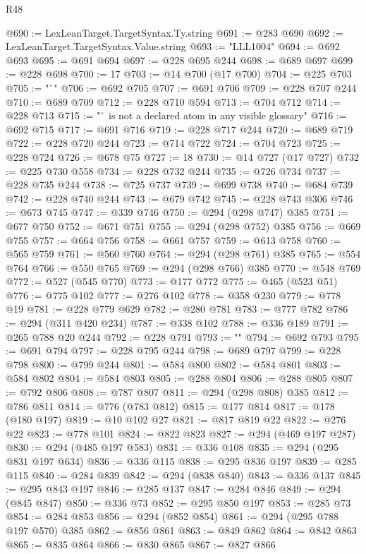 \begin{lexlean}{R48}
\begin{coremodule}
@690 := LexLeanTarget.TargetSyntax.Ty.string
@691 := @283 @690
@692 := LexLeanTarget.TargetSyntax.Value.string
@693 := "LLL1004"
@694 := @692 @693
@695 := @691 @694
@697 := @228 @695 @244
@698 := @689 @697
@699 := @228 @698
@700 := 17
@703 := @14 @700 (@17 @700)
@704 := @225 @703
@705 := "`"
@706 := @692 @705
@707 := @691 @706
@709 := @228 @707 @244
@710 := @689 @709
@712 := @228 @710 @594
@713 := @704 @712
@714 := @228 @713
@715 := "` is not a declared atom in any visible glossary"
@716 := @692 @715
@717 := @691 @716
@719 := @228 @717 @244
@720 := @689 @719
@722 := @228 @720 @244
@723 := @714 @722
@724 := @704 @723
@725 := @228 @724
@726 := @678 @75
@727 := 18
@730 := @14 @727 (@17 @727)
@732 := @225 @730 @558
@734 := @228 @732 @244
@735 := @726 @734
@737 := @228 @735 @244
@738 := @725 @737
@739 := @699 @738
@740 := @684 @739
@742 := @228 @740 @244
@743 := @679 @742
@745 := @228 @743 @306
@746 := @673 @745
@747 := @339 @746
@750 := @294 (@298 @747) @385
@751 := @677 @750
@752 := @671 @751
@755 := @294 (@298 @752) @385
@756 := @669 @755
@757 := @664 @756
@758 := @661 @757
@759 := @613 @758
@760 := @565 @759
@761 := @560 @760
@764 := @294 (@298 @761) @385
@765 := @554 @764
@766 := @550 @765
@769 := @294 (@298 @766) @385
@770 := @548 @769
@772 := @527 (@545 @770)
@773 := @177 @772
@775 := @465 (@523 @51)
@776 := @775 @102
@777 := @276 @102
@778 := @358 @230
@779 := @778 @19
@781 := @228 @779 @629
@782 := @280 @781
@783 := @777 @782
@786 := @294 (@311 @420 @234)
@787 := @338 @102
@788 := @336 @189
@791 := @265 @788 @20 @244
@792 := @228 @791
@793 := ""
@794 := @692 @793
@795 := @691 @794
@797 := @228 @795 @244
@798 := @689 @797
@799 := @228 @798
@800 := @799 @244
@801 := @584 @800
@802 := @584 @801
@803 := @584 @802
@804 := @584 @803
@805 := @288 @804
@806 := @288 @805
@807 := @792 @806
@808 := @787 @807
@811 := @294 (@298 @808) @385
@812 := @786 @811
@814 := @776 (@783 @812)
@815 := @177 @814
@817 := @178 (@180 @197)
@819 := @10 @102 @27
@821 := @817 @819 @22
@822 := @276 @22
@823 := @778 @101
@824 := @822 @823
@827 := @294 (@469 @197 @287)
@830 := @294 (@485 @197 @583)
@831 := @336 @108
@835 := @294 (@295 @831 @197 @634)
@836 := @336 @115
@838 := @295 @836 @197
@839 := @285 @115
@840 := @284 @839
@842 := @294 (@838 @840)
@843 := @336 @137
@845 := @295 @843 @197
@846 := @285 @137
@847 := @284 @846
@849 := @294 (@845 @847)
@850 := @336 @73
@852 := @295 @850 @197
@853 := @285 @73
@854 := @284 @853
@856 := @294 (@852 @854)
@861 := @294 (@295 @788 @197 @570) @385
@862 := @856 @861
@863 := @849 @862
@864 := @842 @863
@865 := @835 @864
@866 := @830 @865
@867 := @827 @866

\end{coremodule}
\end{lexlean}
